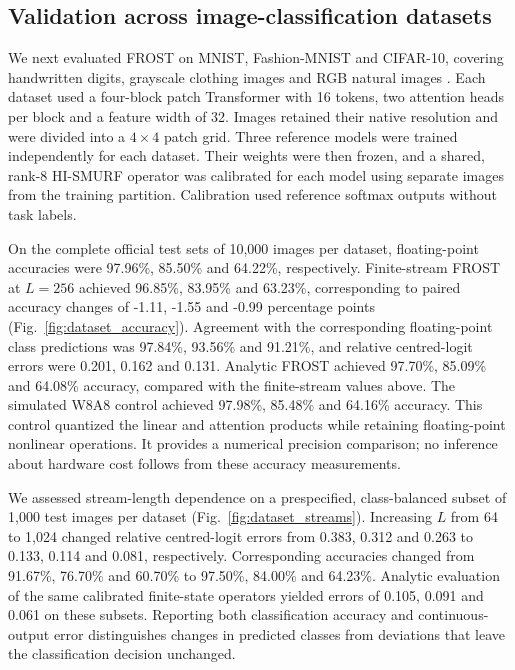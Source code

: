 \subsection{Validation across image-classification datasets}
\label{sec:dataset_validation}

We next evaluated FROST on MNIST, Fashion-MNIST and CIFAR-10, covering
handwritten digits, grayscale clothing images and RGB natural images
\cite{lecun1998gradient,xiao2017fashion,krizhevsky2009learning}.
Each dataset used a four-block patch Transformer with 16 tokens, two
attention heads per block and a feature width of 32. Images retained their
native resolution and were divided into a $4\times4$ patch grid. Three
reference models were trained independently for each dataset. Their
weights were then frozen, and a shared, rank-8 HI-SMURF operator was
calibrated for each model using separate images from the training
partition. Calibration used reference softmax outputs without task labels.

On the complete official test sets of 10,000 images per dataset,
floating-point accuracies were 97.96\%, 85.50\% and 64.22\%,
respectively. Finite-stream FROST at $L=256$ achieved
96.85\%, 83.95\% and 63.23\%, corresponding to paired accuracy
changes of -1.11, -1.55 and -0.99 percentage points
(Fig.~\ref{fig:dataset_accuracy}). Agreement with the corresponding
floating-point class predictions was 97.84\%, 93.56\% and 91.21\%,
and relative centred-logit errors were 0.201, 0.162 and 0.131.
Analytic FROST achieved 97.70\%, 85.09\% and 64.08\%
accuracy, compared with the finite-stream values above.
The simulated W8A8 control achieved 97.98\%, 85.48\% and 64.16\%
accuracy. This control quantized the linear and attention products while
retaining floating-point nonlinear operations. It provides a numerical
precision comparison; no inference about hardware cost follows from
these accuracy measurements.

We assessed stream-length dependence on a prespecified, class-balanced
subset of 1,000 test images per dataset
(Fig.~\ref{fig:dataset_streams}). Increasing $L$ from 64 to 1,024
changed relative centred-logit errors from 0.383, 0.312 and 0.263
to 0.133, 0.114 and 0.081, respectively. Corresponding accuracies changed
from 91.67\%, 76.70\% and 60.70\% to
97.50\%, 84.00\% and 64.23\%. Analytic evaluation of the same
calibrated finite-state operators yielded errors of
0.105, 0.091 and 0.061 on these subsets. Reporting both classification
accuracy and continuous-output error distinguishes changes in predicted
classes from deviations that leave the classification decision unchanged.

